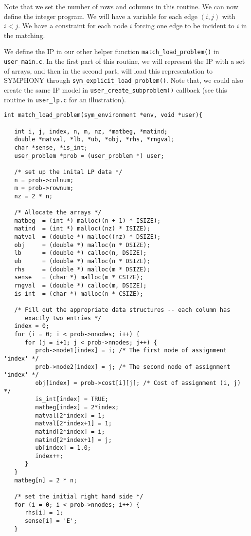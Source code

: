 \documentclass[11pt]{article}
\begin{document}
{Note that we set the number of rows and columns in this routine. We can now
define the integer program. We will have a variable for each edge $(i,j)$ with
$i<j$. We have a constraint for each node $i$ forcing one edge to be incident
to $i$ in the matching.

We define the IP in our other helper function 
\texttt{match\_load\_problem()} in \texttt{user\_main.c}. In the 
first part of this routine, we will represent the IP with a set of arrays, 
and then in the second part, will load this representation to SYMPHONY through 
\texttt{sym\_explicit\_load\_problem()}. Note that, we could also create the 
same IP model in \texttt{user\_create\_subproblem()} callback (see 
this routine in \texttt{user\_lp.c} for an illustration).

\begin{verbatim}
int match_load_problem(sym_environment *env, void *user){
   
   int i, j, index, n, m, nz, *matbeg, *matind;
   double *matval, *lb, *ub, *obj, *rhs, *rngval;
   char *sense, *is_int;
   user_problem *prob = (user_problem *) user;

   /* set up the inital LP data */
   n = prob->colnum;
   m = prob->rownum;
   nz = 2 * n;

   /* Allocate the arrays */
   matbeg  = (int *) malloc((n + 1) * ISIZE);
   matind  = (int *) malloc((nz) * ISIZE);
   matval  = (double *) malloc((nz) * DSIZE);
   obj     = (double *) malloc(n * DSIZE);
   lb      = (double *) calloc(n, DSIZE);
   ub      = (double *) malloc(n * DSIZE);
   rhs     = (double *) malloc(m * DSIZE);
   sense   = (char *) malloc(m * CSIZE);
   rngval  = (double *) calloc(m, DSIZE);
   is_int  = (char *) malloc(n * CSIZE);
   
   /* Fill out the appropriate data structures -- each column has
      exactly two entries */
   index = 0;
   for (i = 0; i < prob->nnodes; i++) {
      for (j = i+1; j < prob->nnodes; j++) {
         prob->node1[index] = i; /* The first node of assignment 'index' */
         prob->node2[index] = j; /* The second node of assignment 'index' */
         obj[index] = prob->cost[i][j]; /* Cost of assignment (i, j) */
         is_int[index] = TRUE;
         matbeg[index] = 2*index;
         matval[2*index] = 1;
         matval[2*index+1] = 1;
         matind[2*index] = i;
         matind[2*index+1] = j;
         ub[index] = 1.0;
         index++;
      }
   }
   matbeg[n] = 2 * n;
   
   /* set the initial right hand side */
   for (i = 0; i < prob->nnodes; i++) {
      rhs[i] = 1;
      sense[i] = 'E';
   }


\end{verbatim}}
\end{document}
